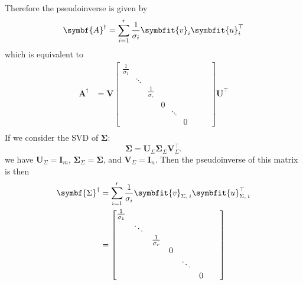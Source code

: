 \documentclass{article}
\begin{document}
Therefore the pseudoinverse is given by
\begin{equation*}
    \symbf{A}^\dagger = \sum_{i = 1}^r \frac{1}{\sigma_i} \symbfit{v}_i \symbfit{u}^\top_i
\end{equation*}
which is equivalent to
\begin{align*}
    \symbf{A}^\dagger & = \symbf{V} \begin{bmatrix}
                                        \frac{1}{\sigma_1} &        &                    &   &        &   &  &  & \\
                                                           & \ddots &                    &   &        &   &  &  & \\
                                                           &        & \frac{1}{\sigma_r} &   &        &   &  &  & \\
                                                           &        &                    & 0 &        &   &  &  & \\
                                                           &        &                    &   & \ddots &   &  &  & \\
                                                           &        &                    &   &        & 0 &  &  &
                                    \end{bmatrix} \symbf{U}^\top \\
\end{align*}
If we consider the SVD of \(\symbf{\Sigma}\):
\begin{equation*}
    \symbf{\Sigma} = \symbf{U}_\Sigma \symbf{\Sigma}_\Sigma \symbf{V}^\top_\Sigma.
\end{equation*}
we have \(\symbf{U}_\Sigma = \symbf{I}_m\), \(\symbf{\Sigma}_\Sigma = \symbf{\Sigma}\), and \(\symbf{V}_\Sigma = \symbf{I}_n\).
Then the pseudoinverse of this matrix is then
\begin{align*}
    \symbf{\Sigma}^\dagger & = \sum_{i = 1}^r \frac{1}{\sigma_i} \symbfit{v}_{\Sigma,\:i} \symbfit{u}^\top_{\Sigma,\:i} \\
                           & = \begin{bmatrix}
                                   \frac{1}{\sigma_1} &        &                    &   &        &   &  & \\
                                                      & \ddots &                    &   &        &   &  & \\
                                                      &        & \frac{1}{\sigma_r} &   &        &   &  & \\
                                                      &        &                    & 0 &        &   &  & \\
                                                      &        &                    &   & \ddots &   &  & \\
                                                      &        &                    &   &        & 0 &  &
                               \end{bmatrix}
\end{align*}
\end{document}
